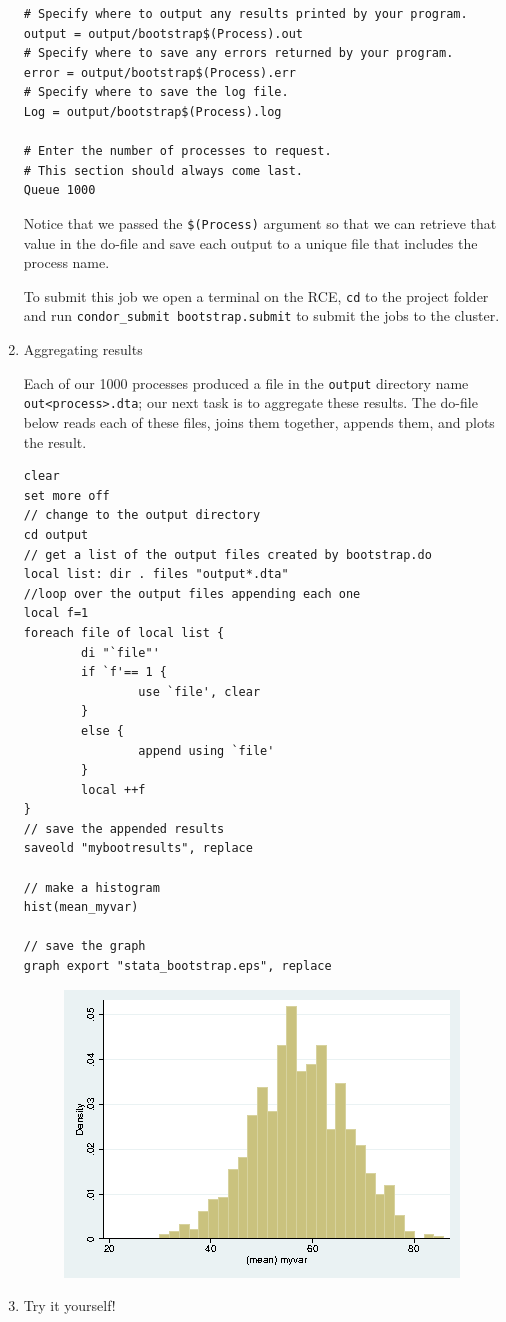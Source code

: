 \documentclass[]{book}
\begin{document}
\begin{enumerate}
\begin{verbatim}
# Specify where to output any results printed by your program.
output = output/bootstrap$(Process).out
# Specify where to save any errors returned by your program.
error = output/bootstrap$(Process).err
# Specify where to save the log file.
Log = output/bootstrap$(Process).log

# Enter the number of processes to request.
# This section should always come last.
Queue 1000
\end{verbatim}

  Notice that we passed the \texttt{\$(Process)} argument so that we can
  retrieve that value in the do-file and save each output to a unique
  file that includes the process name.

  To submit this job we open a terminal on the RCE, \texttt{cd} to the
  project folder and run \texttt{condor\_submit\ bootstrap.submit} to
  submit the jobs to the cluster.
\item
  Aggregating results

  Each of our 1000 processes produced a file in the \texttt{output}
  directory name \texttt{out\textless{}process\textgreater{}.dta}; our
  next task is to aggregate these results. The do-file below reads each
  of these files, joins them together, appends them, and plots the
  result.

\begin{verbatim}
clear
set more off
// change to the output directory
cd output
// get a list of the output files created by bootstrap.do
local list: dir . files "output*.dta"
//loop over the output files appending each one
local f=1
foreach file of local list {
        di "`file"'
        if `f'== 1 {
                use `file', clear
        }
        else {
                append using `file'
        }
        local ++f
}
// save the appended results
saveold "mybootresults", replace

// make a histogram
hist(mean_myvar)

// save the graph
graph export "stata_bootstrap.eps", replace
\end{verbatim}

  \begin{figure}
  \centering
  \includegraphics{images/stata_bootstrap.png}
  \caption{}
  \end{figure}
\item
  Try it yourself!


\end{enumerate}
\end{document}
